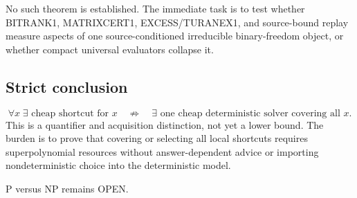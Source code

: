 No such theorem is established. The immediate task is to test whether BITRANK1, MATRIXCERT1, EXCESS/TURANEX1, and source-bound replay measure aspects of one source-conditioned irreducible binary-freedom object, or whether compact universal evaluators collapse it.

\subsection*{Strict conclusion}
\[
\boxed{\forall x\;\exists\text{ cheap shortcut for }x}
\quad\not\Rightarrow\quad
\boxed{\exists\text{ one cheap deterministic solver covering all }x}.
\]
This is a quantifier and acquisition distinction, not yet a lower bound. The burden is to prove that covering or selecting all local shortcuts requires superpolynomial resources without answer-dependent advice or importing nondeterministic choice into the deterministic model.

P versus NP remains OPEN.

